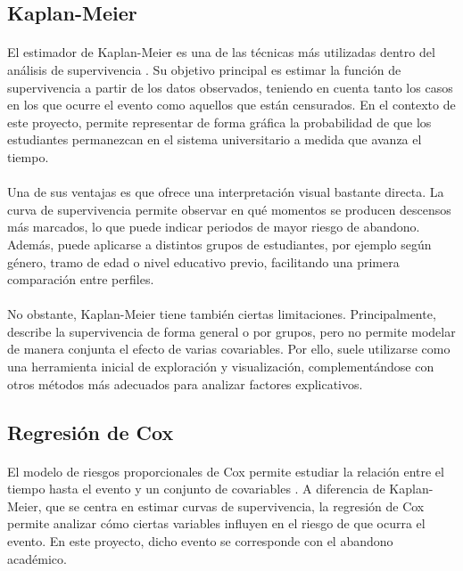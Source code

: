 \subsection{Kaplan-Meier}
\paragraph*{}El estimador de Kaplan-Meier es una de las técnicas más utilizadas dentro del análisis de supervivencia \cite{datatab_kaplan}. Su objetivo principal es estimar la función de supervivencia a partir de los datos observados, teniendo en cuenta tanto los casos en los que ocurre el evento como aquellos que están censurados. En el contexto de este proyecto, permite representar de forma gráfica la probabilidad de que los estudiantes permanezcan en el sistema universitario a medida que avanza el tiempo.

\paragraph*{}Una de sus ventajas es que ofrece una interpretación visual bastante directa. La curva de supervivencia permite observar en qué momentos se producen descensos más marcados, lo que puede indicar periodos de mayor riesgo de abandono. Además, puede aplicarse a distintos grupos de estudiantes, por ejemplo según género, tramo de edad o nivel educativo previo, facilitando una primera comparación entre perfiles.

\paragraph*{}No obstante, Kaplan-Meier tiene también ciertas limitaciones. Principalmente, describe la supervivencia de forma general o por grupos, pero no permite modelar de manera conjunta el efecto de varias covariables. Por ello, suele utilizarse como una herramienta inicial de exploración y visualización, complementándose con otros métodos más adecuados para analizar factores explicativos.

\subsection{Regresión de Cox}
\paragraph*{}El modelo de riesgos proporcionales de Cox permite estudiar la relación entre el tiempo hasta el evento y un conjunto de covariables \cite{datatab_cox}. A diferencia de Kaplan-Meier, que se centra en estimar curvas de supervivencia, la regresión de Cox permite analizar cómo ciertas variables influyen en el riesgo de que ocurra el evento. En este proyecto, dicho evento se corresponde con el abandono académico.

